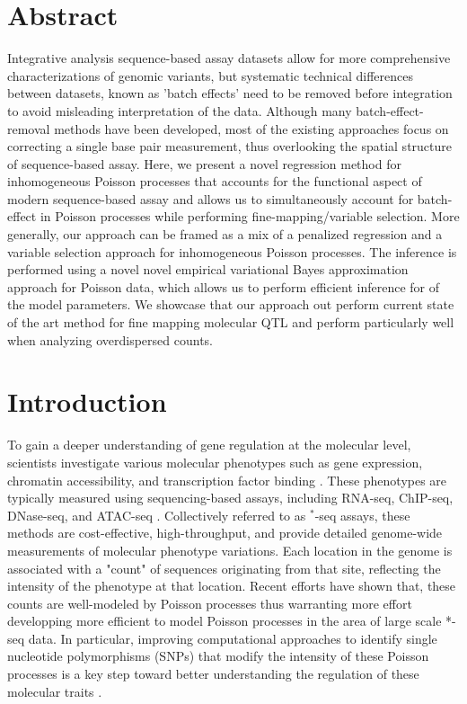 
\section*{Abstract}


 Integrative analysis sequence-based assay datasets allow for more comprehensive
characterizations of genomic variants, but systematic technical differences between datasets, known as 'batch effects' need
to be removed before integration to avoid misleading interpretation of the data. Although many batch-effect-removal methods have been developed, most of the existing approaches focus on correcting a single base pair measurement, thus overlooking the spatial structure of sequence-based assay.
Here, we present a  novel regression method for inhomogeneous Poisson processes that accounts for the functional aspect of modern sequence-based assay and allows us to simultaneously account for batch-effect in Poisson processes while performing fine-mapping/variable selection. More generally, our approach can be framed as a mix of a  penalized regression and a variable selection approach for inhomogeneous  Poisson processes.
 The inference is performed using a novel novel empirical  variational Bayes approximation approach for   Poisson data, which allows us to perform efficient  inference for of the model parameters. We showcase that our approach out perform current state of the art method for fine mapping molecular QTL and perform particularly well when analyzing overdispersed counts.


\section{Introduction}

 


To gain a deeper understanding of gene regulation at the molecular level, scientists investigate various molecular phenotypes such as gene expression, chromatin accessibility, and transcription factor binding \cite{visscher_10_2017,pickrell_joint_2014,degner_dnase_2012,bock_analysing_2012,teschendorff_statistical_2018}. These phenotypes are typically measured using sequencing-based assays, including RNA-seq, ChIP-seq, DNase-seq, and ATAC-seq \citep{robertson_genome-wide_2007, mortazavi_mapping_2008,buenrostro_ATAC-seq_2015}. Collectively referred to as $^*$-seq assays, these methods are cost-effective, high-throughput, and provide detailed genome-wide measurements of molecular phenotype variations. Each location in the genome is associated with a "count" of sequences originating from that site, reflecting the intensity of the phenotype at that location. Recent efforts have shown that, these counts    are well-modeled by Poisson processes \citep{sarkar_separating_2021} thus warranting more effort  developping more efficient to model Poisson processes in the area of large scale *-seq data. In particular, improving computational approaches to identify single nucleotide polymorphisms (SNPs) that modify the intensity of these Poisson processes is a key step toward better understanding the regulation of these molecular traits \cite{aguet_molecular_2023}.

